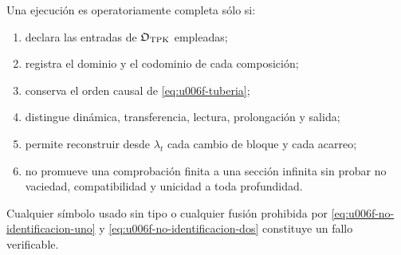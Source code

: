 \begin{criterion}
\label{crit:u006f-completitud}
Una ejecución es operatoriamente completa sólo si:
\begin{enumerate}
 \item declara las entradas de \(\mathfrak O_{\rm TPK}\) empleadas;
 \item registra el dominio y el codominio de cada composición;
 \item conserva el orden causal de \eqref{eq:u006f-tuberia};
 \item distingue dinámica, transferencia, lectura, prolongación y salida;
 \item permite reconstruir desde \(\lambda_t\) cada cambio de bloque y
 cada acarreo;
 \item no promueve una comprobación finita a una sección infinita sin
 probar no vaciedad, compatibilidad y unicidad a toda profundidad.
\end{enumerate}
Cualquier símbolo usado sin tipo o cualquier fusión prohibida por
\eqref{eq:u006f-no-identificacion-uno} y
\eqref{eq:u006f-no-identificacion-dos} constituye un fallo verificable.
\end{criterion}

